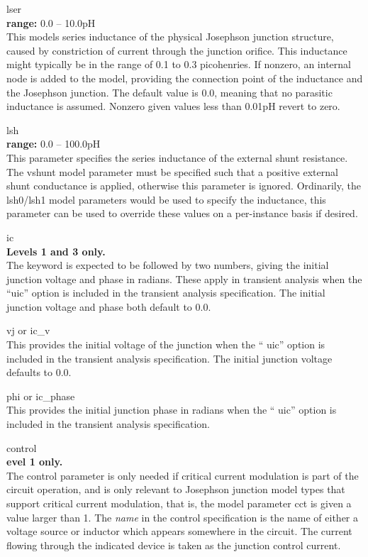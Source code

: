 \begin{description}
\item{\vt lser}\\
{\bf range:} 0.0 -- 10.0pH\\
This models series inductance of the physical Josephson junction
structure, caused by constriction of current through the junction
orifice.  This inductance might typically be in the range of 0.1 to
0.3 picohenries.  If nonzero, an internal node is added to the model,
providing the connection point of the inductance and the Josephson
junction.  The default value is 0.0, meaning that no parasitic
inductance is assumed.  Nonzero given values less than 0.01pH revert
to zero.

\item{\vt lsh}\\
{\bf range:} 0.0 -- 100.0pH\\
This parameter specifies the series inductance of the external shunt
resistance.  The {\vt vshunt} model parameter must be specified such
that a positive external shunt conductance is applied, otherwise this
parameter is ignored.  Ordinarily, the {\vt lsh0}/{\vt lsh1} model
parameters would be used to specify the inductance, this parameter can
be used to override these values on a per-instance basis if desired.

\item{\vt ic}\\
{\bf Levels 1 and 3 only.}\\
The keyword is expected to be followed by two numbers, giving the
initial junction voltage and phase in radians.  These apply in
transient analysis when the ``{\vt uic}'' option is included in the
transient analysis specification.  The initial junction voltage and
phase both default to 0.0.

\item{{\vt vj} or {\vt ic\_v}}\\
This provides the initial voltage of the junction when the ``{\vt
uic}'' option is included in the transient analysis specification. 
The initial junction voltage defaults to 0.0.

\item{{\vt phi} or {\vt ic\_phase}}\\
This provides the initial junction phase in radians when the ``{\vt
uic}'' option is included in the transient analysis specification.

\item{\vt control}\\
{\bf evel 1 only.}\\
The {\vt control} parameter is only needed if critical current
modulation is part of the circuit operation, and is only relevant to
Josephson junction model types that support critical current
modulation, that is, the model parameter {\vt cct} is given a value
larger than 1.  The {\it name} in the {\vt control} specification is
the name of either a voltage source or inductor which appears
somewhere in the circuit.  The current flowing through the indicated
device is taken as the junction control current.


\end{description}
